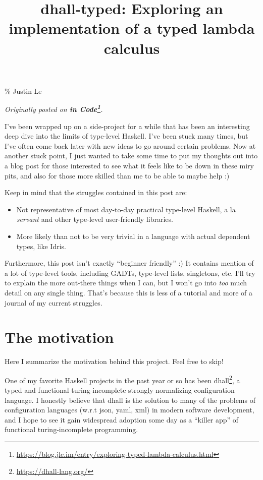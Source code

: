 \documentclass[]{article}
\title{dhall-typed: Exploring an implementation of a typed lambda calculus}
\renewcommand{\href}[2]{#2\footnote{\url{#1}}}
\begin{document}
\maketitle

\% Justin Le

\emph{Originally posted on
\textbf{\href{https://blog.jle.im/entry/exploring-typed-lambda-calculus.html}{in
Code}}.}

I've been wrapped up on a side-project for a while that has been an interesting
deep dive into the limits of type-level Haskell. I've been stuck many times, but
I've often come back later with new ideas to go around certain problems. Now at
another stuck point, I just wanted to take some time to put my thoughts out into
a blog post for those interested to see what it feels like to be down in these
miry pits, and also for those more skilled than me to be able to maybe help :)

Keep in mind that the struggles contained in this post are:

\begin{itemize}
\tightlist
\item
  Not representative of most day-to-day practical type-level Haskell, a la
  \emph{servant} and other type-level user-friendly libraries.
\item
  More likely than not to be very trivial in a language with actual dependent
  types, like Idris.
\end{itemize}

Furthermore, this post isn't exactly ``beginner friendly'' :) It contains
mention of a lot of type-level tools, including GADTs, type-level lists,
singletons, etc. I'll try to explain the more out-there things when I can, but I
won't go into \emph{too} much detail on any single thing. That's because this is
less of a tutorial and more of a journal of my current struggles.

\section{The motivation}\label{the-motivation}

Here I summarize the motivation behind this project. Feel free to skip!

One of my favorite Haskell projects in the past year or so has been
\href{https://dhall-lang.org/}{dhall}, a typed and functional turing-incomplete
strongly normalizing configuration language. I honestly believe that dhall is
the solution to many of the problems of configuration languages (w.r.t json,
yaml, xml) in modern software development, and I hope to see it gain widespread
adoption some day as a ``killer app'' of functional turing-incomplete
programming.
\end{document}

